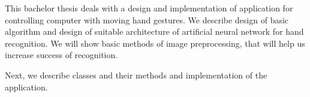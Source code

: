 This bachelor thesis deals with a design and implementation of application for controlling computer with moving hand gestures. We describe design of basic algorithm and design of suitable architecture of artificial neural network for hand recognition. We will show basic methods of image preprocessing, that will help us increase success of recognition.

Next, we describe classes and their methods and implementation of the application.